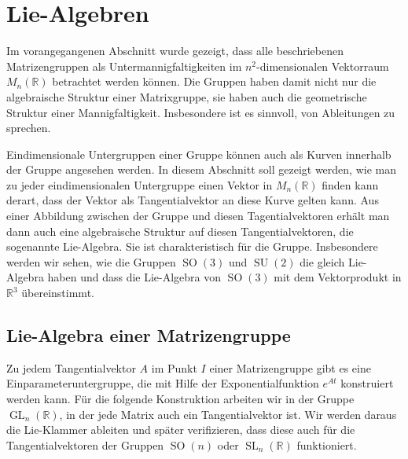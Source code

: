 %
%
%
\section{Lie-Algebren
\label{buch:section:lie-algebren}}
Im vorangegangenen Abschnitt wurde gezeigt, dass alle beschriebenen
Matrizengruppen als Untermannigfaltigkeiten im $n^2$-dimensionalen
Vektorraum $M_n(\mathbb{R})$ betrachtet werden können.
Die Gruppen haben damit nicht nur die algebraische Struktur einer
Matrixgruppe, sie haben auch die geometrische Struktur einer 
Mannigfaltigkeit.
Insbesondere ist es sinnvoll, von Ableitungen zu sprechen.

Eindimensionale Untergruppen einer Gruppe können auch als Kurven
innerhalb der Gruppe angesehen werden.
In diesem Abschnitt soll gezeigt werden, wie man zu jeder eindimensionalen
Untergruppe einen Vektor in $M_n(\mathbb{R})$ finden kann derart, dass
der Vektor als Tangentialvektor an diese Kurve gelten kann.
Aus einer Abbildung zwischen der Gruppe und diesen Tagentialvektoren
erhält man dann auch eine algebraische Struktur auf diesen Tangentialvektoren,
die sogenannte Lie-Algebra.
Sie ist charakteristisch für die Gruppe.
Insbesondere werden wir sehen, wie die Gruppen $\operatorname{SO}(3)$ 
und $\operatorname{SU}(2)$ die gleich Lie-Algebra haben und dass die
Lie-Algebra von $\operatorname{SO}(3)$ mit dem Vektorprodukt in $\mathbb{R}^3$
übereinstimmt.
%

%
%
\subsection{Lie-Algebra einer Matrizengruppe
\label{buch:section:lie-algebra-einer-matrizengruppe}}
Zu jedem Tangentialvektor $A$ im Punkt $I$ einer Matrizengruppe gibt es
eine Einparameteruntergruppe, die mit Hilfe der Exponentialfunktion
$e^{At}$ konstruiert werden kann.
Für die folgende Konstruktion arbeiten wir in der Gruppe
$\operatorname{GL}_n(\mathbb{R})$, in der jede Matrix auch ein
Tangentialvektor ist.
Wir werden daraus die Lie-Klammer ableiten und später verifizieren,
dass diese auch für die Tangentialvektoren der Gruppen
$\operatorname{SO}(n)$ oder $\operatorname{SL}_n(\mathbb{R})$ funktioniert.

